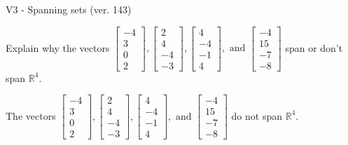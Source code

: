 \begin{exercise}
  \begin{exerciseTitle}V3 - Spanning sets (ver. 143)\end{exerciseTitle}
  \begin{exerciseStatement}
    Explain why the vectors \(\left[\begin{array}{r}
-4 \\
3 \\
0 \\
2
\end{array}\right] , \left[\begin{array}{r}
2 \\
4 \\
-4 \\
-3
\end{array}\right] , \left[\begin{array}{r}
4 \\
-4 \\
-1 \\
4
\end{array}\right] , \text{ and } \left[\begin{array}{r}
-4 \\
15 \\
-7 \\
-8
\end{array}\right]\) span or don't span \(\mathbb{R}^4\). 
	


  \end{exerciseStatement}
  \begin{exerciseAnswer}
   The vectors \(\left[\begin{array}{r}
-4 \\
3 \\
0 \\
2
\end{array}\right] , \left[\begin{array}{r}
2 \\
4 \\
-4 \\
-3
\end{array}\right] , \left[\begin{array}{r}
4 \\
-4 \\
-1 \\
4
\end{array}\right] , \text{ and } \left[\begin{array}{r}
-4 \\
15 \\
-7 \\
-8
\end{array}\right]\) 
  	 do not  
	span \(\mathbb{R}^4\).
  


  \end{exerciseAnswer}
\end{exercise}